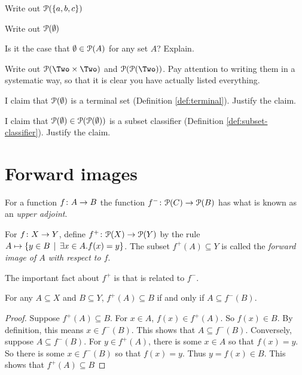 \begin{exercises}
	\begin{nextexercise}
		\item Write out ${\mathcal{P}}(\{a,b,c\})$
		\item Write out ${\mathcal{P}}(\emptyset)$
		\item Is it the case that $\emptyset \in {\mathcal{P}}(A)$ for any set $A$? Explain. 
		\item Write out $\powerset(\Two\times \Two)$ and $\powerset(\powerset(\Two))$. Pay attention to writing them in a systematic way, so that it is clear you have actually listed everything.
		\item I claim that ${\mathcal{P}}(\emptyset)$ is a terminal set (Definition \ref{def:terminal}). Justify the claim.
		\item I claim that ${\mathcal{P}}(\emptyset)\in {\mathcal{P}}({\mathcal{P}}(\emptyset))$ is a subset classifier (Definition \ref{def:subset-classifier}). Justify the claim.
	\end{nextexercise}
\end{exercises}

\section{Forward images}

For a function ${f}\colon{A}\to{B}$ the function ${f^-}\colon{{\mathcal{P}}(C)}\to{{\mathcal{P}}(B)}$ has what is known as an \emph{upper adjoint}. 

\begin{defn}
	For ${f}\colon{X}\to{Y}$, define ${f^+}\colon{{\mathcal{P}}(X)}\to{{\mathcal{P}}(Y)}$ by the rule $A\mapsto \{y\in B\,\mid\, \exists x\in A.f(x)=y\}$. The subset 
	$f^+(A)\subseteq Y$ is called the \emph{forward image of $A$ with respect to $f$}.
\end{defn}

The important fact about $f^+$ is that is related to $f^-$.

\begin{lemma}
	For any $A\subseteq X$ and $B\subseteq Y$,
	$f^+(A)\subseteq B$ if and only if $A\subseteq f^-(B)$.
	
	\begin{proof}
		Suppose $f^+(A)\subseteq B$. For $x\in A$, $f(x)\in f^+(A)$. So $f(x)\in B$.
		By definition, this means $x\in f^-(B)$. This shows that $A\subseteq f^-(B)$.
		Conversely, suppose $A\subseteq f^-(B)$.
		For $y\in f^+(A)$, there is some $x\in A$ so that $f(x)=y$.
		So there is some $x\in f^-(B)$ so that $f(x)=y$.
		Thus $y=f(x)\in B$.
		This shows that $f^+(A)\subseteq B$
	\end{proof}
\end{lemma}

